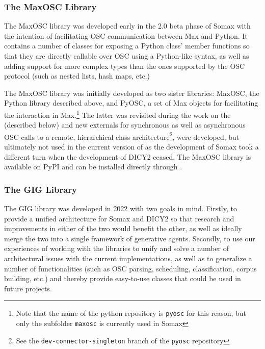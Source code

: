 \subsubsection{The MaxOSC Library}\label{ssec:2-maxosc}

The MaxOSC library was developed early in the 2.0 beta phase of Somax with the intention of facilitating OSC communication between Max and Python. It contains a number of classes for exposing a Python class' member functions so that they are directly callable over OSC using a Python-like syntax, as well as adding support for more complex types than the ones supported by the OSC protocol \cite{osc2022} (such as nested lists, hash maps, etc.)

The MaxOSC library was initially developed as two sister libraries: MaxOSC, the Python library described above, and PyOSC, a set of Max objects for facilitating the interaction in Max.\footnote{Note that the name of the python repository is \texttt{pyosc} for this reason, but only the subfolder \texttt{maxosc} is currently used in Somax} The latter was revisited during the work on the \cite{gigrepo} (described below) and new externals for synchronous as well as asynchronous OSC calls to a remote, hierarchical class architecture\footnote{See the \texttt{dev-connector-singleton} branch of the \texttt{pyosc} repository}, were developed, but ultimately not used in the current version of as the development of Somax took a different turn when the development of DICY2 ceased. The MaxOSC library is available on PyPI and can be installed directly through .


\subsubsection{The GIG Library}\label{ssec:2-gig}

The GIG library \cite{gigrepo} was developed in 2022 with two goals in mind. Firstly, to provide a unified architecture for Somax and DICY2 so that research and improvements in either of the two would benefit the other, as well as ideally merge the two into a single framework of generative agents. Secondly, to use our experiences of working with the libraries to unify and solve a number of architectural issues with the current implementations, as well as to  generalize a number of functionalities (such as OSC parsing, scheduling, classification, corpus building, etc.) and thereby provide easy-to-use classes that could be used in future projects. 

